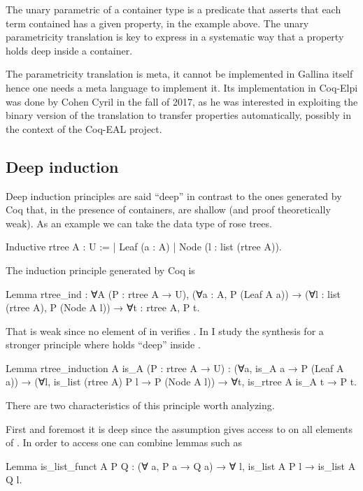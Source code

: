 \documentclass[a4paper, 11pt]{book}
\begin{document}
The unary parametric of a container type is a predicate that
asserts that each term contained has a given property, 
in the example above. The unary parametricity translation is key to express in a
systematic way that a property holds deep inside a container.

The parametricity translation is meta, it cannot be implemented in Gallina
itself hence one needs a meta language to implement it. Its implementation
in Coq-Elpi was done by Cohen Cyril in the fall of 2017, as he was interested
in exploiting the binary version of the translation to transfer properties
automatically, possibly in the context of the Coq-EAL project.


\subsection{Deep induction}

Deep induction principles are said ``deep'' in contrast to the ones generated
by Coq that, in the presence of containers, are shallow (and proof theoretically
weak). As an example we can take the data type of rose trees.

\begin{coqcode}
Inductive rtree A : U :=
| Leaf (a : A)
| Node (l : list (rtree A)).
\end{coqcode}

The induction principle generated by Coq is

\begin{coqcode}
Lemma rtree_ind : ∀A (P : rtree A → U),
  (∀a : A, P (Leaf A a)) →
  (∀l : list (rtree A), P (Node A l)) →
  ∀t : rtree A, P t.
\end{coqcode}

That is weak since no element of  in 
verifies . In \cite{tassi:hal-01897468} I study the synthesis
for a stronger principle where  holds ``deep'' inside .

\begin{coqcode}
Lemma rtree_induction A is_A (P : rtree A → U) :
  (∀a, is_A a → P (Leaf A a)) →
  (∀l, is_list (rtree A) P l → P (Node A l)) →
     ∀t, is_rtree A is_A t → P t.
\end{coqcode}

There are two characteristics of this principle worth analyzing.

First and foremost it is deep since the assumption
 gives access to  on all
elements of .
In order to access  one can combine lemmas such as
\begin{coqcode}
Lemma is_list_funct A P Q : (∀ a, P a → Q a) → ∀ l, is_list A P l → is_list A Q l.
\end{coqcode}
\end{document}
